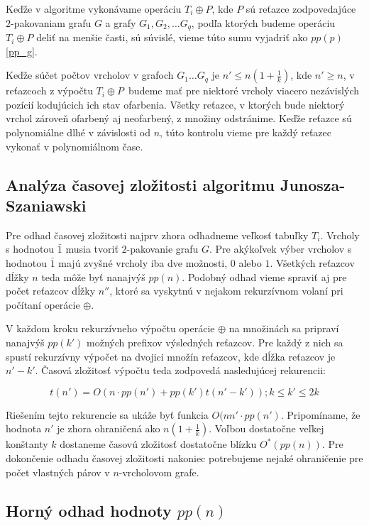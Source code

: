 Keďže v algoritme vykonávame operáciu $T_i \oplus P$, kde $P$ sú reťazce zodpovedajúce
$2$-pakovaniam grafu $G$ a grafy $G_1, G_2, \ldots G_q$, podľa ktorých budeme operáciu $T_i \oplus P$
deliť na menšie časti, sú súvislé, vieme túto sumu vyjadriť ako $pp(p)$\ref{pp_g}.

Keďže súčet počtov vrcholov v grafoch $G_1 \ldots G_q$ je $n' \leq n(1 + \frac{1}{k})$, kde
$n' \ge n$, v reťazcoch z výpočtu $T_i \oplus P$ budeme mať pre niektoré vrcholy viacero
nezávislých pozícií kodujúcich ich stav ofarbenia. Všetky reťazce, v ktorých bude niektorý
vrchol zároveň ofarbený aj neofarbený, z množiny odstránime. Keďže reťazce sú polynomiálne
dlhé v závislosti od $n$, túto kontrolu vieme pre každý reťazec vykonať v polynomiálnom čase.

\subsection{Analýza časovej zložitosti algoritmu Junosza-Szaniawski}

Pre odhad časovej zložitosti najprv zhora odhadneme veľkosť tabuľky $T_i$.
Vrcholy s hodnotou $\bar{1}$ musia tvoriť $2$-pakovanie grafu $G$. Pre akýkoľvek
výber vrcholov s hodnotou $\bar{1}$ majú zvyšné vrcholy iba dve možnosti, $0$ alebo $1$. Všetkých
reťazcov dĺžky $n$ teda môže byť nanajvýš $pp(n)$. Podobný odhad vieme spraviť aj
pre počet reťazcov dĺžky $n''$, ktoré sa vyskytnú v nejakom rekurzívnom volaní pri
počítaní operácie $\oplus$.

V každom kroku rekurzívneho výpočtu operácie $\oplus$ na množinách sa pripraví nanajvýš
$pp(k')$ možných prefixov výsledných reťazcov. Pre každý z nich sa spustí rekurzívny
výpočet na dvojici množín reťazcov, kde dĺžka reťazcov je $n' - k'$. Časová zložitosť
výpočtu teda zodpovedá nasledujúcej rekurencii:

$$t(n') = O(n \cdot pp(n') + pp(k')t(n' - k')); k \leq k' \leq 2k $$

Riešením tejto rekurencie sa ukáže byť funkcia $O(nn' \cdot pp(n')$. Pripomíname, že hodnota
$n'$ je zhora ohraničená ako $n(1 + \frac{1}{k})$. Voľbou dostatočne veľkej
konštanty $k$ dostaneme časovú zložitosť dostatočne blízku $O^*(pp(n))$. Pre dokončenie
odhadu časovej zložitosti nakoniec potrebujeme nejaké ohraničenie pre počet vlastných
párov v $n$-vrcholovom grafe.

\subsection{Horný odhad hodnoty $pp(n)$}


